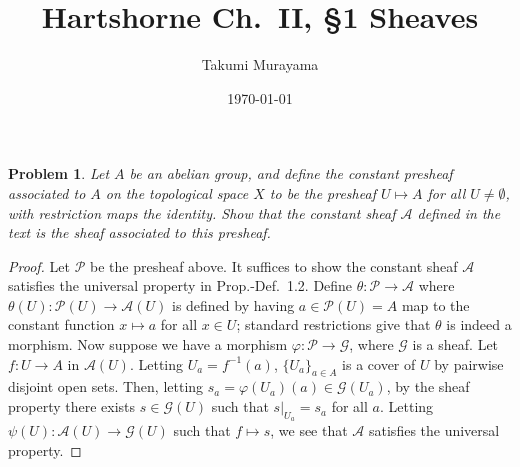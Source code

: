 \documentclass[12pt,letterpaper]{article}
\title{Hartshorne Ch.~II, \S1 Sheaves}
\author{Takumi Murayama}
\date{\today}
\newtheorem{problem}{Problem}[section]
\theoremstyle{definition}
\theoremstyle{remark}
\numberwithin{equation}{section}
\numberwithin{figure}{problem}
\begin{document}
\maketitle
\setcounter{section}{1}
\begin{problem}
  Let $A$ be an abelian group, and define the \emph{constant presheaf} associated to $A$ on the topological space $X$ to be the presheaf $U \mapsto A$ for all $U \ne \emptyset$, with restriction maps the identity. Show that the constant sheaf $\mathscr{A}$ defined in the text is the sheaf associated to this presheaf.
\end{problem}
\begin{proof}
  Let $\mathcal{P}$ be the presheaf above. It suffices to show the constant sheaf $\mathscr{A}$ satisfies the universal property in Prop.-Def.~1.2. Define $\theta\colon\mathcal{P} \to \mathscr{A}$ where $\theta(U)\colon\mathcal{P}(U)\to\mathscr{A}(U)$ is defined by having $a \in \mathcal{P}(U) = A$ map to the constant function $x \mapsto a$ for all $x \in U$; standard restrictions give that $\theta$ is indeed a morphism. Now suppose we have a morphism $\varphi\colon\mathcal{P}\to\mathscr{G}$, where $\mathscr{G}$ is a sheaf. Let $f\colon U\to A$ in $\mathscr{A}(U)$. Letting $U_a = f^{-1}(a)$, $\{U_a\}_{a \in A}$ is a cover of $U$ by pairwise disjoint open sets. Then, letting $s_a = \varphi(U_a)(a) \in \mathscr{G}(U_a)$, by the sheaf property there exists $s \in \mathscr{G}(U)$ such that $s\vert_{U_a} = s_a$ for all $a$. Letting $\psi(U)\colon\mathscr{A}(U) \to \mathscr{G}(U)$ such that $f \mapsto s$, we see that $\mathscr{A}$ satisfies the universal property.
\end{proof}
\end{document}
